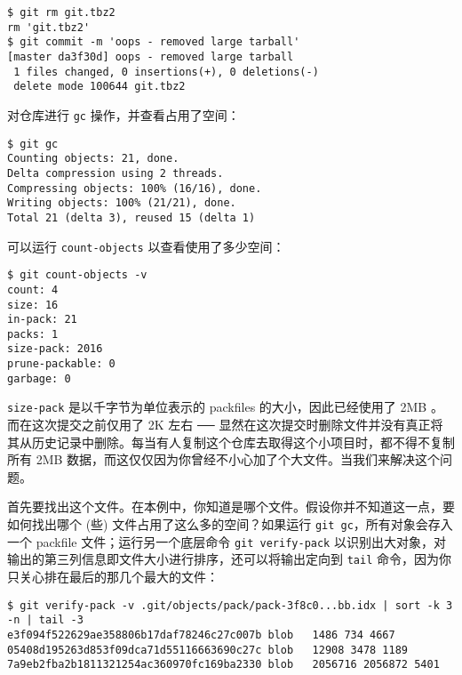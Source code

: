 \documentclass[a4paper]{book}
\begin{document}
\begin{shaded}\begin{verbatim}
$ git rm git.tbz2
rm 'git.tbz2'
$ git commit -m 'oops - removed large tarball'
[master da3f30d] oops - removed large tarball
 1 files changed, 0 insertions(+), 0 deletions(-)
 delete mode 100644 git.tbz2
\end{verbatim}\end{shaded}

对仓库进行 \texttt{gc} 操作，并查看占用了空间：

\begin{shaded}\begin{verbatim}
$ git gc
Counting objects: 21, done.
Delta compression using 2 threads.
Compressing objects: 100% (16/16), done.
Writing objects: 100% (21/21), done.
Total 21 (delta 3), reused 15 (delta 1)
\end{verbatim}\end{shaded}

可以运行 \texttt{count-objects} 以查看使用了多少空间：

\begin{shaded}\begin{verbatim}
$ git count-objects -v
count: 4
size: 16
in-pack: 21
packs: 1
size-pack: 2016
prune-packable: 0
garbage: 0
\end{verbatim}\end{shaded}

\texttt{size-pack} 是以千字节为单位表示的 packfiles 的大小，因此已经使用了 2MB 。而在这次提交之前仅用了 2K 左右 ── 显然在这次提交时删除文件并没有真正将其从历史记录中删除。每当有人复制这个仓库去取得这个小项目时，都不得不复制所有 2MB 数据，而这仅仅因为你曾经不小心加了个大文件。当我们来解决这个问题。

首先要找出这个文件。在本例中，你知道是哪个文件。假设你并不知道这一点，要如何找出哪个 (些) 文件占用了这么多的空间？如果运行 \texttt{git gc}，所有对象会存入一个 packfile 文件；运行另一个底层命令 \texttt{git verify-pack} 以识别出大对象，对输出的第三列信息即文件大小进行排序，还可以将输出定向到 \texttt{tail} 命令，因为你只关心排在最后的那几个最大的文件：

\begin{shaded}\begin{verbatim}
$ git verify-pack -v .git/objects/pack/pack-3f8c0...bb.idx | sort -k 3 -n | tail -3
e3f094f522629ae358806b17daf78246c27c007b blob   1486 734 4667
05408d195263d853f09dca71d55116663690c27c blob   12908 3478 1189
7a9eb2fba2b1811321254ac360970fc169ba2330 blob   2056716 2056872 5401
\end{verbatim}\end{shaded}
\end{document}
